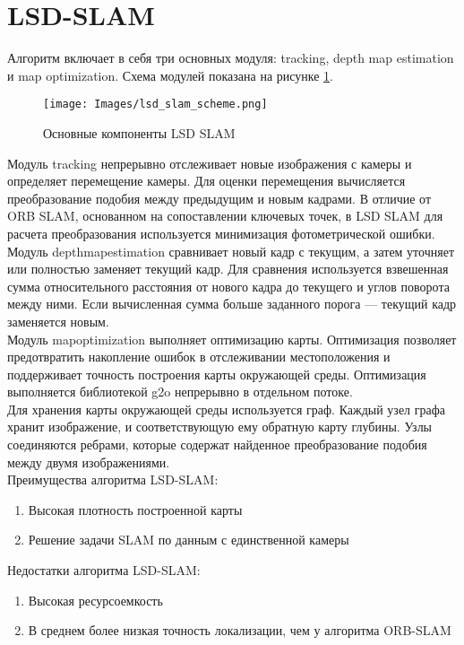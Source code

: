 \documentclass{mipt-thesis-bs}
\begin{document}
\section{LSD-SLAM}
Алгоритм \cite{engel2014lsd} включает в себя три основных модуля: tracking, depth map estimation и map optimization. Схема модулей показана на рисунке \ref{figurelsdslam}.\\

\begin{figure}
	\centering
	\texttt{[image: Images/lsd\_slam\_scheme.png]}
	\caption{Основные компоненты LSD SLAM}
	\label{figurelsdslam}
\end{figure}

Модуль tracking непрерывно отслеживает новые изображения с камеры и определяет перемещение камеры. Для оценки перемещения вычисляется преобразование подобия между предыдущим и новым кадрами. В отличие от ORB SLAM, основанном на сопоставлении ключевых точек, в LSD SLAM для расчета преобразования используется минимизация фотометрической ошибки.\\
Модуль depthmapestimation сравнивает новый кадр с текущим, а затем уточняет или полностью заменяет текущий кадр. Для сравнения используется взвешенная сумма относительного расстояния от нового кадра до текущего и углов поворота между ними. Если вычисленная сумма больше заданного порога — текущий кадр заменяется новым.\\
Модуль mapoptimization выполняет оптимизацию карты. Оптимизация позволяет предотвратить накопление ошибок в отслеживании местоположения и поддерживает точность построения карты окружающей среды. Оптимизация выполняется библиотекой g2o непрерывно в отдельном потоке.\\
Для хранения карты окружающей среды используется граф. Каждый узел графа хранит изображение, и соответствующую ему обратную карту глубины. Узлы соединяются ребрами, которые содержат найденное преобразование подобия между двумя изображениями.\\
Преимущества алгоритма LSD-SLAM:
\begin{enumerate}
	\item {Высокая плотность построенной карты}
	\item {Решение задачи SLAM по данным с единственной камеры}
\end{enumerate}
Недостатки алгоритма LSD-SLAM:
\begin{enumerate}
	\item {Высокая ресурсоемкость}
	\item {В среднем более низкая точность локализации, чем у алгоритма ORB-SLAM}
\end{enumerate}
\end{document}
